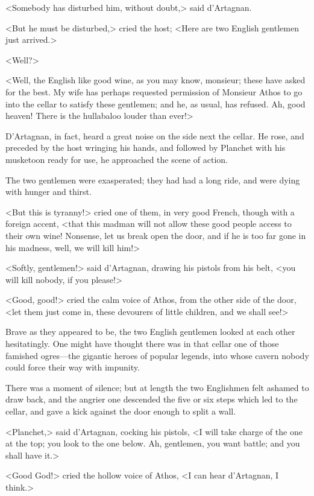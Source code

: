 <Somebody has disturbed him, without doubt,> said d'Artagnan. 

<But he must be disturbed,> cried the host; <Here are two English gentlemen just arrived.> 

<Well?> 

<Well, the English like good wine, as you may know, monsieur; these have asked for the best. My wife has perhaps requested permission of Monsieur Athos to go into the cellar to satisfy these gentlemen; and he, as usual, has refused. Ah, good heaven! There is the hullabaloo louder than ever!> 

D'Artagnan, in fact, heard a great noise on the side next the cellar. He rose, and preceded by the host wringing his hands, and followed by Planchet with his musketoon ready for use, he approached the scene of action. 

The two gentlemen were exasperated; they had had a long ride, and were dying with hunger and thirst. 

<But this is tyranny!> cried one of them, in very good French, though with a foreign accent, <that this madman will not allow these good people access to their own wine! Nonsense, let us break open the door, and if he is too far gone in his madness, well, we will kill him!> 

<Softly, gentlemen!> said d'Artagnan, drawing his pistols from his belt, <you will kill nobody, if you please!> 

<Good, good!> cried the calm voice of Athos, from the other side of the door, <let them just come in, these devourers of little children, and we shall see!> 

Brave as they appeared to be, the two English gentlemen looked at each other hesitatingly. One might have thought there was in that cellar one of those famished ogres---the gigantic heroes of popular legends, into whose cavern nobody could force their way with impunity. 

There was a moment of silence; but at length the two Englishmen felt ashamed to draw back, and the angrier one descended the five or six steps which led to the cellar, and gave a kick against the door enough to split a wall. 

<Planchet,> said d'Artagnan, cocking his pistols, <I will take charge of the one at the top; you look to the one below. Ah, gentlemen, you want battle; and you shall have it.> 

<Good God!> cried the hollow voice of Athos, <I can hear d'Artagnan, I think.> 

